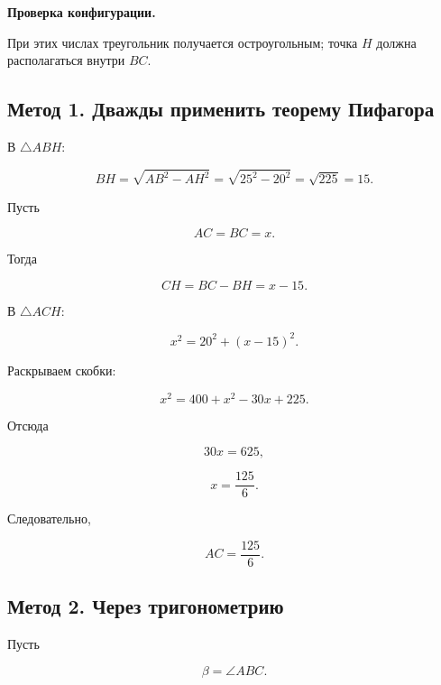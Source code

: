 \documentclass[a4paper,12pt]{article}
\newcommand{\important}[1]{%
  \textbf{\color{darkaccent}#1}%
}
\begin{document}
\begin{center}
\end{center}

\important{Проверка конфигурации.}
При этих числах треугольник получается остроугольным;
точка $H$ должна располагаться внутри $BC$.

\subsection{Метод 1. Дважды применить теорему Пифагора}

В $\triangle ABH$:

\[
BH
=
\sqrt{AB^2-AH^2}
=
\sqrt{25^2-20^2}
=
\sqrt{225}
=
15.
\]

Пусть

\[
AC=BC=x.
\]

Тогда

\[
CH
=
BC-BH
=
x-15.
\]

В $\triangle ACH$:

\[
x^2
=
20^2+(x-15)^2.
\]

Раскрываем скобки:

\[
x^2
=
400+x^2-30x+225.
\]

Отсюда

\[
30x=625,
\]

\[
\boxed{x=\frac{125}{6}}.
\]

Следовательно,

\[
\boxed{AC=\frac{125}{6}}.
\]

\subsection{Метод 2. Через тригонометрию}

Пусть

\[
\beta=\angle ABC.
\]
\end{document}

